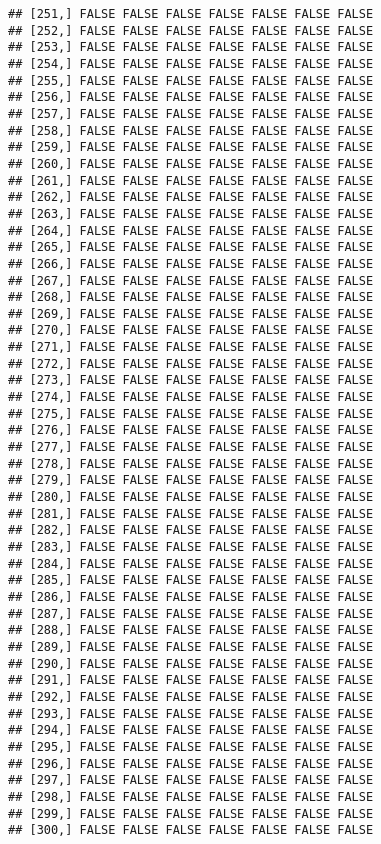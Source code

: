 \documentclass[
]{article}
\begin{document}
\begin{verbatim}
## [251,] FALSE FALSE FALSE FALSE FALSE FALSE FALSE
## [252,] FALSE FALSE FALSE FALSE FALSE FALSE FALSE
## [253,] FALSE FALSE FALSE FALSE FALSE FALSE FALSE
## [254,] FALSE FALSE FALSE FALSE FALSE FALSE FALSE
## [255,] FALSE FALSE FALSE FALSE FALSE FALSE FALSE
## [256,] FALSE FALSE FALSE FALSE FALSE FALSE FALSE
## [257,] FALSE FALSE FALSE FALSE FALSE FALSE FALSE
## [258,] FALSE FALSE FALSE FALSE FALSE FALSE FALSE
## [259,] FALSE FALSE FALSE FALSE FALSE FALSE FALSE
## [260,] FALSE FALSE FALSE FALSE FALSE FALSE FALSE
## [261,] FALSE FALSE FALSE FALSE FALSE FALSE FALSE
## [262,] FALSE FALSE FALSE FALSE FALSE FALSE FALSE
## [263,] FALSE FALSE FALSE FALSE FALSE FALSE FALSE
## [264,] FALSE FALSE FALSE FALSE FALSE FALSE FALSE
## [265,] FALSE FALSE FALSE FALSE FALSE FALSE FALSE
## [266,] FALSE FALSE FALSE FALSE FALSE FALSE FALSE
## [267,] FALSE FALSE FALSE FALSE FALSE FALSE FALSE
## [268,] FALSE FALSE FALSE FALSE FALSE FALSE FALSE
## [269,] FALSE FALSE FALSE FALSE FALSE FALSE FALSE
## [270,] FALSE FALSE FALSE FALSE FALSE FALSE FALSE
## [271,] FALSE FALSE FALSE FALSE FALSE FALSE FALSE
## [272,] FALSE FALSE FALSE FALSE FALSE FALSE FALSE
## [273,] FALSE FALSE FALSE FALSE FALSE FALSE FALSE
## [274,] FALSE FALSE FALSE FALSE FALSE FALSE FALSE
## [275,] FALSE FALSE FALSE FALSE FALSE FALSE FALSE
## [276,] FALSE FALSE FALSE FALSE FALSE FALSE FALSE
## [277,] FALSE FALSE FALSE FALSE FALSE FALSE FALSE
## [278,] FALSE FALSE FALSE FALSE FALSE FALSE FALSE
## [279,] FALSE FALSE FALSE FALSE FALSE FALSE FALSE
## [280,] FALSE FALSE FALSE FALSE FALSE FALSE FALSE
## [281,] FALSE FALSE FALSE FALSE FALSE FALSE FALSE
## [282,] FALSE FALSE FALSE FALSE FALSE FALSE FALSE
## [283,] FALSE FALSE FALSE FALSE FALSE FALSE FALSE
## [284,] FALSE FALSE FALSE FALSE FALSE FALSE FALSE
## [285,] FALSE FALSE FALSE FALSE FALSE FALSE FALSE
## [286,] FALSE FALSE FALSE FALSE FALSE FALSE FALSE
## [287,] FALSE FALSE FALSE FALSE FALSE FALSE FALSE
## [288,] FALSE FALSE FALSE FALSE FALSE FALSE FALSE
## [289,] FALSE FALSE FALSE FALSE FALSE FALSE FALSE
## [290,] FALSE FALSE FALSE FALSE FALSE FALSE FALSE
## [291,] FALSE FALSE FALSE FALSE FALSE FALSE FALSE
## [292,] FALSE FALSE FALSE FALSE FALSE FALSE FALSE
## [293,] FALSE FALSE FALSE FALSE FALSE FALSE FALSE
## [294,] FALSE FALSE FALSE FALSE FALSE FALSE FALSE
## [295,] FALSE FALSE FALSE FALSE FALSE FALSE FALSE
## [296,] FALSE FALSE FALSE FALSE FALSE FALSE FALSE
## [297,] FALSE FALSE FALSE FALSE FALSE FALSE FALSE
## [298,] FALSE FALSE FALSE FALSE FALSE FALSE FALSE
## [299,] FALSE FALSE FALSE FALSE FALSE FALSE FALSE
## [300,] FALSE FALSE FALSE FALSE FALSE FALSE FALSE

\end{verbatim}
\end{document}
